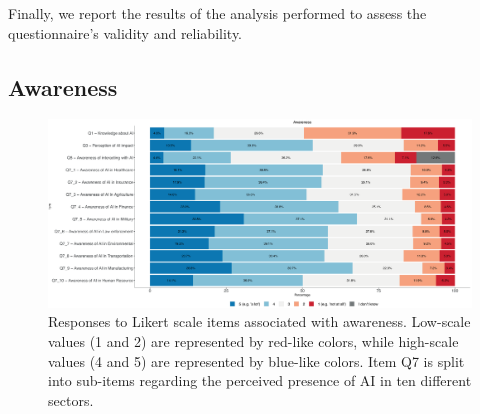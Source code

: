 \documentclass{article}
\begin{document}
Finally, we report the results of the analysis performed to assess the questionnaire's validity and reliability. 

\subsection{Awareness}

\begin{figure}[!ht]
\centering
\includegraphics[width=\linewidth]{Fig1.eps}
\caption{Responses to Likert scale items associated with awareness. Low-scale values (1 and 2) are represented by red-like colors, while high-scale values (4 and 5) are represented by blue-like colors. Item Q7 is split into sub-items regarding the perceived presence of AI in ten different sectors. %
}

\label{Fig_1}

\end{figure}
\end{document}
